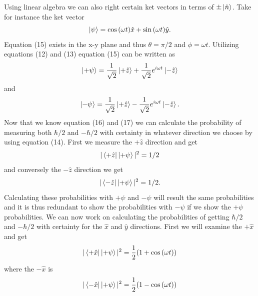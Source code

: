 \documentclass[twocolumn]{article}
\begin{document}
Using linear algebra we can also right certain ket vectors in terms of $\pm\ket{\hat{n}}$. Take for instance the ket vector
\begin{equation}
\ket{\psi}=\cos{(\omega t)}\hat{x}+\sin{(\omega t)}\hat{y}.
\end{equation}
Equation (15) exists in the x-y plane and thus $\theta=\pi/2$ and $\phi=\omega t$. Utilizing equations (12) and (13) equation (15) can be written as
\begin{equation}
\ket{+\psi}=\frac{1}{\sqrt{2}}\ket{+\hat{z}}+\frac{1}{\sqrt{2}}e^{i\omega t}\ket{-\hat{z}}
\end{equation}
and
\begin{equation}
\ket{-\psi}=\frac{1}{\sqrt{2}}\ket{+\hat{z}}-\frac{1}{\sqrt{2}}e^{i\omega t}\ket{-\hat{z}}.
\end{equation}
Now that we know equation (16) and (17) we can calculate the probability of measuring both $\hbar/2$ and $-\hbar/2$ with certainty in whatever direction we choose by using equation (14). First we measure the $+\hat{z}$ direction and get
\begin{equation}
|\bra{+\hat{z}}\ket{+\psi}|^2=1/2
\end{equation}
and conversely the $-\hat{z}$ direction we get 
\begin{equation}
|\bra{-\hat{z}}\ket{+\psi}|^2=1/2.
\end{equation}
Calculating these probabilities with $+\psi$ and $-\psi$ will result the same probabilities and it is thus redundant to show the probabilities with $-\psi$ if we show the $+\psi$ probabilities. We can now work on calculating the probabilities of getting $\hbar/2$ and $-\hbar/2$ with certainty for the $\hat{x}$ and $\hat{y}$ directions. First we will examine the $+\hat{x}$ and get
\begin{equation}
|\bra{+\hat{x}}\ket{+\psi}|^2=\frac{1}{2}(1+\cos{(\omega t)})
\end{equation}
where the $-\hat{x}$ is
\begin{equation}
|\bra{-\hat{x}}\ket{+\psi}|^2=\frac{1}{2}(1-\cos{(\omega t)})
\end{equation}
\end{document}
